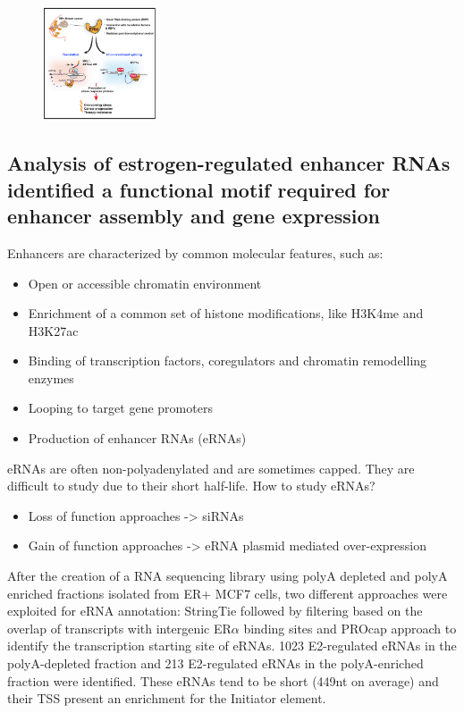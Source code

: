 \begin{figure}
\centering
\includegraphics[width=0.3\textwidth]{../_resources/era.png}
\caption{}
\end{figure}

\subsection{Analysis of estrogen-regulated enhancer RNAs identified a functional motif required for enhancer assembly and gene expression}
Enhancers are characterized by common molecular features, such as: 
\begin{itemize}
\tightlist
\item Open or accessible chromatin environment 
\item Enrichment of a common set of histone modifications, like H3K4me and H3K27ac 
\item Binding of transcription factors, coregulators and chromatin remodelling enzymes 
\item Looping to target gene promoters  
\item Production of enhancer RNAs (eRNAs)
\end{itemize}

eRNAs are often non-polyadenylated and are sometimes capped.  They are difficult to study due to their short half-life. 
How to study eRNAs? 
\begin{itemize}
\tightlist
\item Loss of function approaches -> siRNAs 
\item Gain of function approaches -> eRNA plasmid mediated over-expression
\end{itemize}

After the creation of a RNA sequencing library using polyA depleted and polyA enriched fractions
isolated from ER+ MCF7 cells, two different approaches were exploited for eRNA annotation: StringTie followed by filtering based on the overlap of transcripts with intergenic ER$\alpha$ binding sites and PROcap approach to identify the transcription starting site of eRNAs.
1023 E2-regulated eRNAs in the polyA-depleted fraction and 213 E2-regulated
eRNAs in the polyA-enriched fraction were identified.
These eRNAs tend to be short (449nt on average) and their TSS present an enrichment for the Initiator element.

